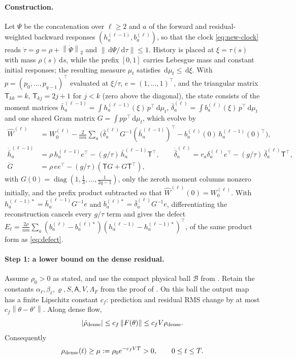 \documentclass[11pt]{article}
\theoremstyle{definition}
\theoremstyle{remark}
\newcommand{\norm}[1]{\left\lVert #1\right\rVert}
\newcommand{\dd}{\,\mathrm{d}}
\newcommand{\diag}{\operatorname{diag}}
\begin{document}
\paragraph{Construction.}
Let $\Psi$ be the concatenation over $\ell\ge2$ and $a$ of the forward and
residual-weighted backward responses $(h^{(\ell-1)}_a,b^{(\ell)}_a)$, so that the
clock \eqref{eq:new-clock} reads $\dot\tau=g=\rho+\norm{\dot\Psi}_2$ and
$\norm{\dd\Psi/\dd\tau}\le1$.  History is placed at $\xi=\tau(s)$ with mass
$\rho(s)\dd s$, while the prefix $[0,1]$ carries Lebesgue mass and constant
initial responses; the resulting measure $\mu_t$ satisfies $\dd\mu_t\le\dd\xi$.
With $p=(p_0,\ldots,p_{q-1})^\top$ evaluated at $\xi/\tau$, $e=(1,\ldots,1)^\top$,
and the triangular matrix $\mathsf T_{kk}=k$, $\mathsf T_{kj}=2j+1$ for $j<k$
(zero above the diagonal), the state consists of the moment matrices
$\bar h^{(\ell-1)}_a=\int h^{(\ell-1)}_a(\xi)\,p^\top\dd\mu_t$,
$\bar\delta^{(\ell)}_a=\int b^{(\ell)}_a(\xi)\,p^\top\dd\mu_t$ and one shared
Gram matrix $G=\int pp^\top\dd\mu_t$, which evolve by
\begin{align}
 \widehat W^{(\ell)}&=W_0^{(\ell)}-\frac{2}{nm}\sum_a
 \bigl(\bar\delta^{(\ell)}_aG^{-1}(\bar h^{(\ell-1)}_a)^\top
 -b^{(\ell)}_a(0)\,h^{(\ell-1)}_a(0)^\top\bigr),\nonumber\\
 \dot{\bar h}^{(\ell-1)}_a&=\rho\,h^{(\ell-1)}_ae^\top-(g/\tau)\,\bar h^{(\ell-1)}_a\mathsf T^\top,
 \qquad
 \dot{\bar\delta}^{(\ell)}_a=r_a\delta_a^{(\ell)}e^\top-(g/\tau)\,\bar\delta^{(\ell)}_a\mathsf T^\top,
 \nonumber\\
 \dot G&=\rho\,ee^\top-(g/\tau)(\mathsf TG+G\mathsf T^\top),     \label{eq:new-ode}
\end{align}
with $G(0)=\diag(1,\tfrac13,\ldots,\tfrac1{2q-1})$, only the zeroth moment
columns nonzero initially, and the prefix product subtracted so that
$\widehat W^{(\ell)}(0)=W_0^{(\ell)}$.  With $h^{(\ell-1)*}_a=\bar h^{(\ell-1)}_aG^{-1}e$
and $b^{(\ell)*}_a=\bar\delta^{(\ell)}_aG^{-1}e$, differentiating the
reconstruction cancels every $g/\tau$ term and gives the defect
$E_\ell=\frac{2\rho}{nm}\sum_a(b^{(\ell)}_a-b^{(\ell)*}_a)(h^{(\ell-1)}_a-h^{(\ell-1)*}_a)^\top$,
of the same product form as \eqref{eq:defect}.

\paragraph{Step 1: a lower bound on the dense residual.}
Assume $\rho_0>0$ as stated, and use the compact physical ball $\mathcal B$ from
.  Retain the constants
$\alpha_\ell,\beta_\ell,\varrho,S,\mathsf A,V,\Lambda_F$ from the proof of .  On
this ball the output map has a finite Lipschitz constant $c_f$: prediction and
residual RMS change by at most $c_f\norm{\theta-\theta'}$.  Along dense flow,
\[
 |\dot\rho_{\rm dense}|\le c_f\norm{F(\theta)}
 \le c_fV\rho_{\rm dense}.
\]
Consequently
\begin{equation}
 \rho_{\rm dense}(t)\ge
 \mu:=\rho_0e^{-c_fVT}>0,\qquad 0\le t\le T.          \label{eq:dense-rho-lower}
\end{equation}
\end{document}
